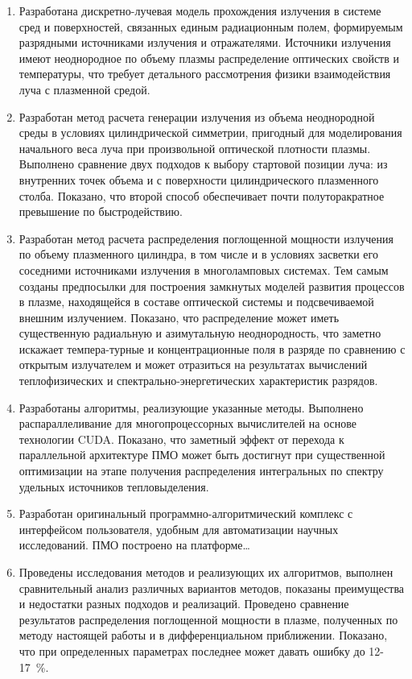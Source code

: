 \begin{enumerate}
	\item Разработана дискретно-лучевая модель прохождения излучения в системе сред и поверхностей, связанных единым радиационным полем, формируемым разрядными источниками излучения и отражателями.
	Источники излучения имеют неоднородное по объему плазмы распределение оптических свойств и температуры, что требует детального рассмотрения  физики  взаимодействия луча с плазменной средой.

	\item Разработан метод расчета генерации излучения из объема неоднородной среды в условиях цилиндрической симметрии, пригодный для моделирования начального веса луча при произвольной оптической плотности плазмы.
	Выполнено сравнение двух подходов к выбору стартовой позиции луча: из внутренних точек объема и с поверхности цилиндрического плазменного столба.
	Показано, что второй способ обеспечивает почти полуторакратное превышение по быстродействию.

	\item Разработан метод расчета распределения поглощенной мощности излучения по объему плазменного цилиндра, в том числе и в условиях засветки его соседними источниками излучения в многоламповых системах.
	Тем самым созданы предпосылки для построения замкнутых  моделей развития процессов в плазме, находящейся  в составе оптической системы и подсвечиваемой внешним излучением. Показано, что распределение может иметь существенную радиальную и азимутальную неоднородность, что заметно искажает темпера-турные и концентрационные поля в разряде по сравнению с открытым излучателем и может отразиться на результатах вычислений теплофизических и спектрально-энергетических характеристик разрядов.

	\item Разработаны алгоритмы, реализующие указанные методы.
	Выполнено распараллеливание для многопроцессорных вычислителей на основе технологии CUDA.
	Показано, что заметный эффект от перехода к параллельной архитектуре ПМО может быть достигнут при существенной оптимизации на этапе получения распределения интегральных по спектру удельных источников тепловыделения.

	\item Разработан оригинальный программно-алгоритмический комплекс с интерфейсом пользователя, удобным для автоматизации научных исследований.
	ПМО построено на платформе…

	\item Проведены исследования методов и реализующих их алгоритмов, выполнен сравнительный анализ различных вариантов методов, показаны преимущества и недостатки разных подходов и реализаций.
	Проведено сравнение результатов распределения поглощенной мощности в плазме, полученных по методу настоящей работы и в дифференциальном приближении.
	Показано, что при определенных параметрах последнее может давать ошибку до 12-17~\%.


\end{enumerate}
